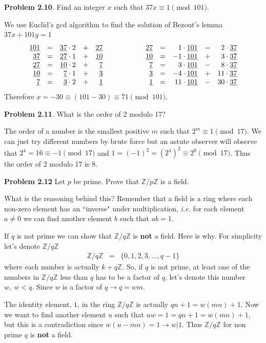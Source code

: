 \documentclass[aps,preprint,preprintnumbers,nofootinbib,showpacs,prd]{revtex4-1}
\newcommand{\ie}{{\it i.e.} }
\newcommand{\ba}{\begin{array}}
\newcommand{\ea}{\end{array}}
\newcommand{\nbea}{\begin{eqnarray*}}
\newcommand{\neea}{\end{eqnarray*}}
\begin{document}
{\bf Problem 2.10}. Find an integer $x$ such that $37x \equiv 1 \pmod{101}$.

We use Euclid's gcd algorithm to find the solution of Bezout's lemma $37x + 101y = 1$
%
\nbea
\ba{r c r c r   c   r c r c r}
\underline{101} & = & \underline{37} \cdot 2 & + & \underline{27} & ~~~~~~~~~~~~ & \underline{27} & = & 1 \cdot \underline{101} & - & 2 \cdot \underline{37} \\
\underline{37} & = & \underline{27} \cdot 1 & + & \underline{10} & & \underline{10} & = & -1 \cdot \underline{101} & + & 3 \cdot \underline{37} \\
\underline{27} & = & \underline{10} \cdot 2 & + & \underline{7} & & \underline{7} & = & 3 \cdot \underline{101} & - & 8 \cdot \underline{37} \\
\underline{10} & = & \underline{7} \cdot 1 & + & \underline{3} & & \underline{3} & = & -4 \cdot \underline{101}  & + & 11 \cdot \underline{37} \\
\underline{7} & = & \underline{3} \cdot 2 & + & \underline{1} & & \underline{1} & = & 11 \cdot \underline{101} & - & 30 \cdot \underline{37}
\ea
\neea
%
Therefore $x=-30 \equiv (101 - 30) \equiv 71 \pmod{101}$.

{\bf Problem 2.11}. What is the order of 2 modulo 17?

The order of a number is the smallest positive $m$ such that $2^m \equiv 1 \pmod{17}$. We can just try different numbers by brute force but an astute observer will observe that $2^4 = 16 \equiv -1 \pmod{17}$ and $1 = (-1)^2 = (2^4)^2 \equiv 2^8 \pmod {17}$. Thus the order of 2 modulo 17 is 8.

{\bf Problem 2.12} Let $p$ be prime. Prove that $\mathbb{Z}/p\mathbb{Z}$ is a field.

What is the reasoning behind this? Remember that a field is a ring where each non-zero element has an ``inverse" under multiplication, \ie for each element $a \neq 0$ we can find another element $b$ such that $ab=1$.

If $q$ is not prime we can show that $\mathbb{Z}/q\mathbb{Z}$ is {\bf not} a field. Here is why. For simplicity let's denote $\mathbb{Z}/q\mathbb{Z}$
%
\nbea
\mathbb{Z}/q\mathbb{Z} & = & \{0,1,2,3, \dots, q-1\}
\neea
%
where each number is actually $k + q\mathbb{Z}$. So, if $q$ is not prime, at least one of the numbers in $\mathbb{Z}/q\mathbb{Z}$ less than $q$ has to be a factor of $q$, let's denote this number $w,~w < q$. Since $w$ is a factor of $q \to q = w m$.

The identity element, $1$, in the ring $\mathbb{Z}/q\mathbb{Z}$ is actually $qn + 1 = w(mn) + 1$. Now we want to find another element $u$ such that $uw = 1 = qn + 1 = w(mn) + 1$, but this is a contradiction since $w (u - mn) = 1 \to w|1$. Thus $\mathbb{Z}/q\mathbb{Z}$ for non prime $q$ is {\bf not} a field.
\end{document}

